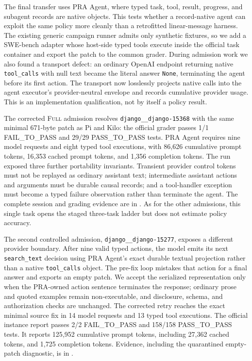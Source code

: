 \documentclass[11pt]{article}
\begin{document}
The final transfer uses PRA Agent, where typed task, tool, result, progress, and
subagent records are native objects. This tests whether a record-native agent can
exploit the same policy more cleanly than a retrofitted linear-message harness.
The existing generic campaign runner admits only synthetic fixtures, so we add
a SWE-bench adapter whose host-side typed tools execute inside the official task
container and export the patch to the common grader.  During admission work we
also found a transport defect: an ordinary OpenAI endpoint returning native
\texttt{tool\_calls} with null text became the literal answer \texttt{None},
terminating the agent before its first action.  The transport now losslessly
projects native calls into the agent executor's provider-neutral envelope and
records cumulative provider usage.  This is an implementation qualification,
not by itself a policy result.

The corrected \textsc{Full} admission resolves
\texttt{django\_\_django-15368} with the same minimal 671-byte patch as Pi and
Kilo: the official grader passes 1/1 FAIL\_TO\_PASS and 29/29 PASS\_TO\_PASS
tests.  PRA Agent requires nine model requests and eight typed tool executions,
with 86,626 cumulative prompt tokens, 16,353 cached prompt tokens, and 1,356
completion tokens.  The run exposed three further portability invariants.
Transient provider control tokens must not be replayed as ordinary assistant
text; intermediate assistant actions and arguments must be durable causal
records; and a tool-handler exception must become a typed failure observation
rather than terminate the agent.  The complete session and grading evidence
are in .  As for
the other admissions, this single task opens the staged three-task ladder but
does not estimate policy accuracy.

The second controlled admission, \texttt{django\_\_django-15277}, exposes a
different provider boundary.  After nine valid typed actions, the model emits
its next \texttt{search\_text} decision using PRA Agent's exact durable textual
projection rather than a native \texttt{tool\_calls} object.  The pre-fix loop
mistakes that action for a final answer and exports an empty patch.  We accept
the serialized representation only when the PRA-owned action sentence
terminates the response; ordinary prose and quoted examples remain
non-executable, and disclosure, schema, and authorization checks are
unchanged.  The corrected retry reaches the exact minimal source fix in 14
model requests and 13 typed tool executions.  The official instance report
passes 2/2 FAIL\_TO\_PASS and 158/158 PASS\_TO\_PASS tests.  It reports 125,952
cumulative prompt tokens, including 27,362 cached tokens, and 1,725 completion
tokens.  Evidence, including the quarantined empty-patch diagnostic, is in
.
\end{document}
